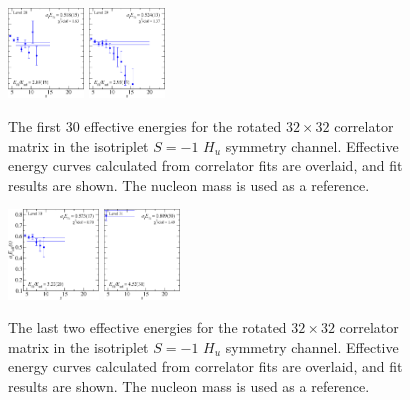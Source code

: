\begin{figure}[H]
    \includegraphics[width=0.18\textwidth]{figures/sigmas/hu/fits/fit_26.pdf}
    \includegraphics[width=0.18\textwidth]{figures/sigmas/hu/fits/fit_24.pdf}
    \caption[The first 30 effective energies for the rotated $32\times 32$ correlator matrix in the isotriplet $S=-1$ $H_u$ symmetry channel. Effective energy curves calculated from correlator fits are overlaid, and fit results are shown.]{The first 30 effective energies for the rotated $32\times 32$ correlator matrix in the isotriplet $S=-1$ $H_u$ symmetry channel. Effective energy curves calculated from correlator fits are overlaid, and fit results are shown. The nucleon mass is used as a reference.}\label{fig:hu_fits1}
\end{figure}

\begin{figure}[H]
    \centering
    \includegraphics[width=0.215\textwidth]{figures/sigmas/hu/fits/fit_28.pdf}
    \includegraphics[width=0.18\textwidth]{figures/sigmas/hu/fits/fit_31.pdf}
    \caption[The last two effective energies for the rotated $32\times 32$ correlator matrix in the isotriplet $S=-1$ $H_u$ symmetry channel.]{The last two effective energies for the rotated $32\times 32$ correlator matrix in the isotriplet $S=-1$ $H_u$ symmetry channel. Effective energy curves calculated from correlator fits are overlaid, and fit results are shown. The nucleon mass is used as a reference.}\label{fig:hu_fits2}
\end{figure}

